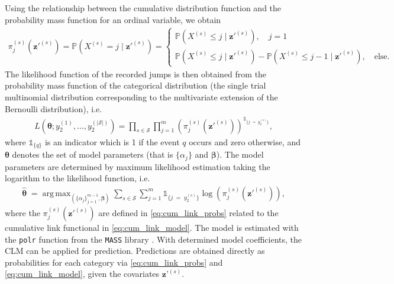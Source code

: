 \documentclass{article}
\DeclareMathOperator*{\argmax}{arg\,max}
\begin{document}
Using the relationship between the cumulative distribution function and the probability mass function for an ordinal variable, we obtain
\begin{align}
     \pi^{(s)}_j\left(\bm{z}'^{(s)}\right) = 
     \mathds{P}\left( X^{(s)} = j \; \vert \; \bm{z}'^{(s)} \right) = 
    \begin{cases}
    \mathds{P}\left( X^{(s)} \leq j \; \vert \; \bm{z}'^{(s)} \right), \quad j = 1 \\
     \mathds{P}\left( X^{(s)} \leq j \; \vert \; \bm{z}'^{(s)} \right) - \mathds{P}\left( X^{(s)} \leq j -1 \; \vert \; \bm{z}'^{(s)} \right), \quad \text{else}.   
    \end{cases} \label{eq:cum_link_probs}
\end{align}
The likelihood function of the recorded jumps is then obtained from the probability mass function of the categorical distribution (the single trial multinomial distribution corresponding to the multivariate extension of the Bernoulli distribution), i.e.
\begin{equation*}
\begin{aligned}
     L\left( \bm{\theta}; y_2^{(1)}, \dots, y_2^{(|\mathcal{S}|)} \right) = \prod_{s \in \mathcal{S}} \prod_{j = 1}^m \left( \pi^{(s)}_j\left(\bm{z}'^{(s)}\right) \right)^{\mathds{1}_{ \{ j \; = \; y_2^{(s)}  \} }}, 
\end{aligned} \label{eq:likelihood_cumlink}
\end{equation*}
where $\mathds{1}_{ \{ q \} }$ is an indicator which is 1 if the event $q$ occurs and zero otherwise, and $\bm{\theta}$ denotes the set of model parameters (that is $\{\alpha_j\}$ and $\bm{\beta}$). The model parameters are determined by maximum likelihood estimation taking the logarithm to the likelihood function, i.e.
\begin{align*}
   \widehat{\pmb{\theta}}  \; = \argmax_{\left( \{ \alpha_{j} \}_{j = 1}^{m-1}, \bm{\beta} \right)} \sum_{s \in \mathcal{S}} \sum_{j = 1}^m 
   \mathds{1}_{ \{ j \; = \; y_2^{(s)} \} } \log\left( \pi^{(s)}_j\left(\bm{z}'^{(s)}\right) \right), 
\end{align*}
where the $\pi^{(s)}_j\left(\bm{z}'^{(s)}\right)$ are defined in \cref{eq:cum_link_probs} related to the cumulative link functional in \cref{eq:cum_link_model}.
The model is estimated with the \texttt{polr} function from the \texttt{MASS} library \citep{mass_R}.
With determined model coefficients, the CLM can be applied for prediction. 
Predictions are obtained directly as probabilities for each category via \cref{eq:cum_link_probs} and \cref{eq:cum_link_model}, given the covariates $\bm{z}’^{(s)}$.
\end{document}
